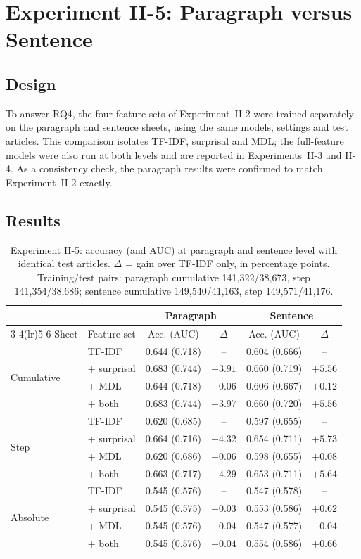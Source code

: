 \documentclass[12pt,a4paper,oneside]{report}
\begin{document}
\section{Experiment II-5: Paragraph versus Sentence}
\subsection{Design}
To answer RQ4, the four feature sets of Experiment~II-2 were trained separately on the paragraph and sentence sheets, using the same models, settings and test articles. This comparison isolates TF-IDF, surprisal and MDL; the full-feature models were also run at both levels and are reported in Experiments~II-3 and II-4. As a consistency check, the paragraph results were confirmed to match Experiment~II-2 exactly.

\subsection{Results}
\begin{table}[ht]
\centering
\small
\caption[Experiment II-5: paragraph versus sentence]{Experiment II-5: accuracy (and AUC) at paragraph and sentence level with identical test articles. $\Delta$ = gain over TF-IDF only, in percentage points. Training/test pairs: paragraph cumulative 141{,}322/38{,}673, step 141{,}354/38{,}686; sentence cumulative 149{,}540/41{,}163, step 149{,}571/41{,}176.}
\label{tab:exp5}
\begin{tabular}{@{}llcccc@{}}
\toprule
 & & \multicolumn{2}{c}{Paragraph} & \multicolumn{2}{c}{Sentence}\\
\cmidrule(lr){3-4}\cmidrule(lr){5-6}
Sheet & Feature set & Acc. (AUC) & $\Delta$ & Acc. (AUC) & $\Delta$\\
\midrule
\multirow{4}{*}{Cumulative} & TF-IDF & 0.644 (0.718) & -- & 0.604 (0.666) & --\\
 & + surprisal & 0.683 (0.744) & $+3.91$ & 0.660 (0.719) & $\mathbf{+5.56}$\\
 & + MDL & 0.644 (0.718) & $+0.06$ & 0.606 (0.667) & $+0.12$\\
 & + both & 0.683 (0.744) & $+3.97$ & 0.660 (0.720) & $+5.56$\\
\midrule
\multirow{4}{*}{Step} & TF-IDF & 0.620 (0.685) & -- & 0.597 (0.655) & --\\
 & + surprisal & 0.664 (0.716) & $+4.32$ & 0.654 (0.711) & $\mathbf{+5.73}$\\
 & + MDL & 0.620 (0.686) & $-0.06$ & 0.598 (0.655) & $+0.08$\\
 & + both & 0.663 (0.717) & $+4.29$ & 0.653 (0.711) & $+5.64$\\
\midrule
\multirow{4}{*}{Absolute} & TF-IDF & 0.545 (0.576) & -- & 0.547 (0.578) & --\\
 & + surprisal & 0.545 (0.575) & $+0.03$ & 0.553 (0.586) & $+0.62$\\
 & + MDL & 0.545 (0.576) & $+0.04$ & 0.547 (0.577) & $-0.04$\\
 & + both & 0.545 (0.576) & $+0.04$ & 0.554 (0.586) & $+0.66$\\
\bottomrule
\end{tabular}
\end{table}
\end{document}

